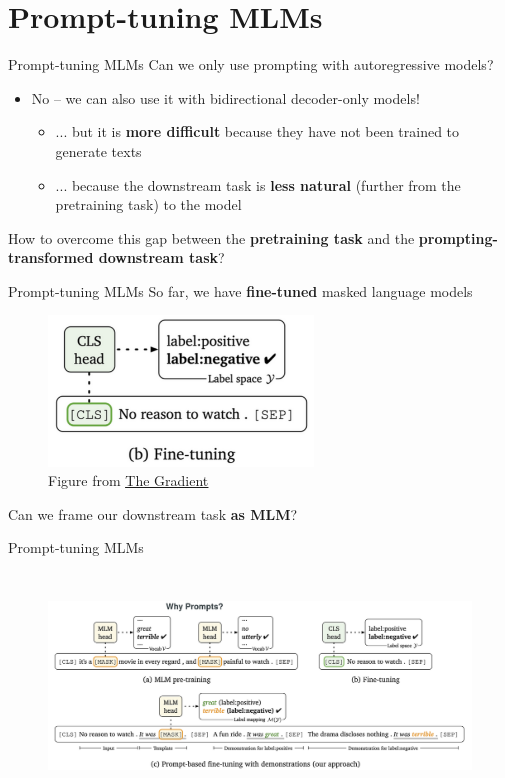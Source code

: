 \documentclass[12pt,aspectratio=169,handout]{beamer}
\begin{document}
\section{Prompt-tuning MLMs}

\begin{frame}{Prompt-tuning MLMs}
	Can we only use prompting with autoregressive models?
	\pause
	\vspace{1em}
	\begin{itemize}
		\item No -- we can also use it with bidirectional decoder-only models!
		\begin{itemize}
		\pause
		\item  ... but it is \textbf{more difficult} because they have not been trained to generate texts
		\pause
		\item ... because the downstream task is \textbf{less natural} (further from the pretraining task) to the model
		\end{itemize}

	\end{itemize}
	\pause
	How to overcome this gap between the \textbf{pretraining task} and the \textbf{prompting-transformed downstream task}?

\end{frame}

\begin{frame}{Prompt-tuning MLMs}
	So far, we have \textbf{fine-tuned} masked language models
	\pause
	\begin{figure}[h]
		\includegraphics[height=4cm]{fine-tuning-mlms}
		\caption*{Figure from \href{https://thegradient.pub/prompting/}{\underline{The Gradient}}}
	\end{figure}
	\pause
	Can we frame our downstream task \textbf{as MLM}?

\end{frame}

\begin{frame}{Prompt-tuning MLMs}
	\begin{figure}[h]
		\includegraphics[height=6cm]{prompting_mlms}
	\end{figure}
\end{frame}
\end{document}

